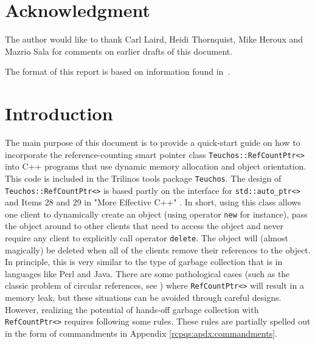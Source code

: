 \documentclass[pdf,ps2pdf,11pt]{SANDreport}
\begin{document}
\section*{Acknowledgment}
The author would like to thank Carl Laird, Heidi Thornquist, Mike
Heroux and Mazrio Sala for comments on earlier drafts of this
document.

The format of this report is based on information found
in~\cite{Sand98-0730}.

%
\clearpage
\tableofcontents

%
\SANDmain %

%
\section{Introduction}
%

The main purpose of this document is to provide a quick-start guide on
how to incorporate the reference-counting smart pointer class
{}\texttt{Teuchos\-::Ref\-Count\-Ptr<>} into C++ programs that use
dynamic memory allocation and object orientation.  This code is
included in the Trilinos {}\cite{ref:Trilinos-Overview} tools package
{}\texttt{Teuchos}.  The design of
{}\texttt{Teuchos\-::Ref\-Count\-Ptr<>} is based partly on the
interface for {}\texttt{std\-::auto\-\_ptr<>} and Items 28 and 29 in
"More Effective C++" {}\cite{ref:meyers_1996}.  In short, using this
class allows one client to dynamically create an object (using
operator {}\texttt{new} for instance), pass the object around to other
clients that need to access the object and never require any client to
explicitly call operator {}\texttt{delete}.  The object will (almost
magically) be deleted when all of the clients remove their references
to the object.  In principle, this is very similar to the type of
garbage collection that is in languages like Perl and Java.  There are
some pathological cases (such as the classic problem of circular
references, see {}\cite[Item 29, page 212]{ref:meyers_1996}) where
{}\texttt{Ref\-Count\-Ptr<>} will result in a memory leak, but these
situations can be avoided through careful designs.  However, realizing
the potential of hands-off garbage collection with
{}\texttt{Ref\-Count\-Ptr<>} requires following some rules.  These
rules are partially spelled out in the form of commandments in
Appendix {}\ref{rcpqs:apdx:commandments}.
\end{document}
